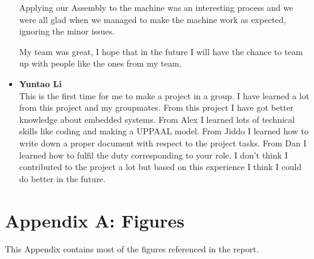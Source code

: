 \documentclass[a4paper,oneside,11pt]{report}
\begin{document}
\begin{itemize}
Applying our Assembly to the machine was an interesting process and we were all glad when we managed to make the machine work as expected, ignoring the minor issues.

My team was great, I hope that in the future I will have the chance to team up with people like the ones from my team.

\item \textbf{Yuntao Li}\\
This is the first time for me to make a project in a group. I have learned a lot from this project and my groupmates. From this project I have got better knowledge about embedded systems. From Alex I learned lots of technical skills like coding and making a UPPAAL model. From Jiddo I learned how to write down a proper document with respect to the project tasks. From Dan I learned how to fulfil the duty corresponding to your role. I don’t think I contributed to the project a lot but based on this experience I think I could do better in the future.
\end{itemize}

\appendix
\chapter*{Appendix A: Figures}
\label{sec:figures}
This Appendix contains most of the figures referenced in the report.
\end{document}

